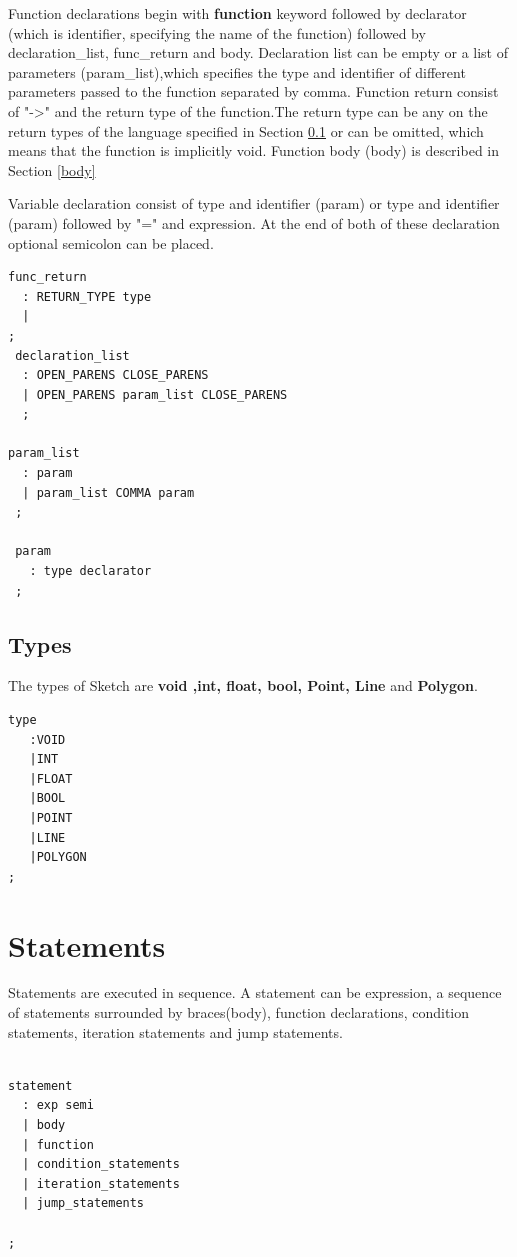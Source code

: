 \documentclass{l3proj}
\begin{document}
Function declarations begin with \textbf{function} keyword followed by declarator (which is identifier, specifying the name of the function) followed by declaration\_list, func\_return and body. 
Declaration list can be empty  or  a list of parameters (param\_list),which specifies the type and identifier of different parameters passed to the function separated by comma. Function return consist of "-\textgreater" and the return type of the function.The return type can be any on the return types of the language specified in Section \ref{types_man} or can be omitted, which means that the function is implicitly void. Function body (body)  is described in Section \ref{body}

Variable declaration consist of type and identifier (param) or type and identifier (param) followed by "=" and expression. At the end of both of these declaration optional semicolon can be placed. 
\begin{lstlisting}
func_return  
  : RETURN_TYPE type
  |
;
 declaration_list 
  : OPEN_PARENS CLOSE_PARENS
  | OPEN_PARENS param_list CLOSE_PARENS
  ;

param_list
  : param 
  | param_list COMMA param
 ;

 param 
   : type declarator
 ; 
\end{lstlisting}
\subsection{Types}
\label{types_man}
The types of Sketch are \textbf{void ,int, float, bool, Point, Line} and \textbf{Polygon}.
\begin{lstlisting}
type
   :VOID 
   |INT
   |FLOAT 
   |BOOL
   |POINT
   |LINE
   |POLYGON
;

\end{lstlisting}
\section {Statements}
Statements are executed in sequence. A statement can be expression, a sequence of statements surrounded by braces(body), function declarations, condition statements, iteration statements and jump statements.

\begin{lstlisting}

statement
  : exp semi
  | body
  | function
  | condition_statements
  | iteration_statements
  | jump_statements

;

\end{lstlisting}
\end{document}
